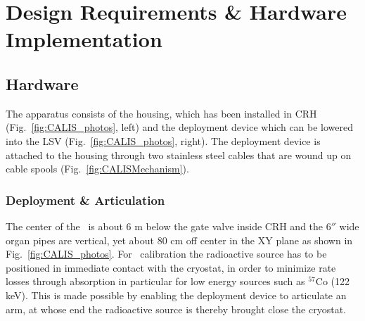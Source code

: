 \section{Design Requirements \& Hardware Implementation} \label{sec:hardware}\label{sec:design_requirements}

\subsection{Hardware}
The apparatus consists of the housing, which has been installed in CRH (Fig.~\ref{fig:CALIS_photos}, left) and the deployment device which can be lowered into the LSV (Fig.~\ref{fig:CALIS_photos}, right). The deployment device is attached to the housing through two stainless steel cables that are wound up on cable spools (Fig.~\ref{fig:CALISMechanism}).

\subsubsection{Deployment \& Articulation}\label{sec:DeploymentArticulation}
The center of the \lsv\ is about 6 m below the gate valve inside CRH
 and the $6''$ wide organ pipes are vertical, yet about 80 cm off center in the XY plane as shown in Fig.~\ref{fig:CALIS_photos}. For \tpc\ calibration the radioactive source has to be positioned in immediate contact with the cryostat, in order to minimize rate losses through absorption in particular for low energy sources such as $^{57}$Co (122 keV). This is made possible by enabling the deployment device to articulate an arm, at whose end the radioactive source is thereby brought close the cryostat. 

